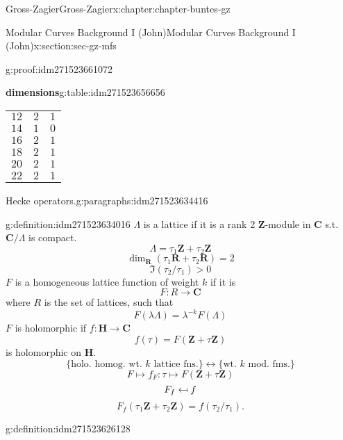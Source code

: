 \documentclass[oneside,10pt,]{book}
\numberwithin{equation}{section}
\providecommand\mapsfrom{\mathrel{\reflectbox{\ensuremath{\mapsto}}}}
\newcommand{\ZZ}{\mathbf{Z}}
\newcommand{\RR}{\mathbf{R}}
\newcommand{\CC}{\mathbf{C}}
\newcommand{\HH}{\mathbf{H}}
\newcommand{\gt}{>}
\begin{document}
\begin{chapterptx}{Gross-Zagier}{}{Gross-Zagier}{}{}{x:chapter:chapter-buntes-gz}
\begin{sectionptx}{Modular Curves Background I (John)}{}{Modular Curves Background I (John)}{}{}{x:section:sec-gz-mfs}
\begin{proofptx}{}{g:proof:idm271523661072}
\begin{tableptx}{\textbf{dimensions}}{g:table:idm271523656656}{}
\begin{tabular}{lll}
\(12\)&\(2\)&\(1\)\tabularnewline[0pt]
\(14\)&\(1\)&\(0\)\tabularnewline[0pt]
\(16\)&\(2\)&\(1\)\tabularnewline[0pt]
\(18\)&\(2\)&\(1\)\tabularnewline[0pt]
\(20\)&\(2\)&\(1\)\tabularnewline[0pt]
\(22\)&\(2\)&\(1\)
\end{tabular}
\end{tableptx}%
\end{proofptx}
\begin{paragraphs}{Hecke operators.}{g:paragraphs:idm271523634416}%
\begin{definition}{}{g:definition:idm271523634016}%
\(\Lambda \) is a lattice if it is a rank 2 \(\ZZ\)-module in \(\CC\) s.t. \(\CC/\Lambda \) is compact.%
\begin{equation*}
\Lambda = \tau _1\ZZ + \tau _2 \ZZ
\end{equation*}
%
\begin{equation*}
\dim_\RR(\tau _1 \RR + \tau _2\RR) = 2
\end{equation*}
%
\begin{equation*}
\Im (\tau _2 / \tau _1 ) \gt 0
\end{equation*}
\(F\) is a homogeneous lattice function of weight \(k\) if it is%
\begin{equation*}
F\colon R \to \CC
\end{equation*}
where \(R\) is the set of lattices, such that%
\begin{equation*}
F(\lambda \Lambda ) = \lambda ^{-k}F(\Lambda )
\end{equation*}
\(F\) is holomorphic if \(f\colon  \HH \to \CC\)%
\begin{equation*}
f(\tau ) = F(\ZZ + \tau \ZZ)
\end{equation*}
is holomorphic on \(\HH\).%
\begin{equation*}
\{\text{holo. homog. wt. }k\text{ lattice fns.}\}\leftrightarrow \{\text{wt. }k\text{ mod. fms.}\}
\end{equation*}
%
\begin{equation*}
F\mapsto f_F\colon \tau  \mapsto F(\ZZ+ \tau \ZZ)
\end{equation*}
%
\begin{equation*}
F_f \mapsfrom f
\end{equation*}
%
\begin{equation*}
F_f (\tau _1 \ZZ+ \tau _2 \ZZ) = f(\tau _2/\tau _1)\text{.}
\end{equation*}
%
\end{definition}
\begin{definition}{}{g:definition:idm271523626128}%

\end{definition}
\end{paragraphs}
\end{sectionptx}
\end{chapterptx}
\end{document}
